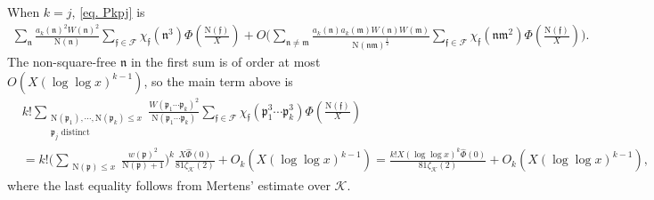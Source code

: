 \documentclass[11pt]{amsart}
\def\p{\mathfrak{p}}
\def\n{\mathfrak{n}}
\def\m{\mathfrak{m}}
\newcommand{\norm}{\mathrm{N}}
\numberwithin{equation}{section}
\theoremstyle{remark}
\begin{document}
When $k=j$, \eqref{eq. Pkpj} is 
\begin{align*}
\sum_{\n} \frac{ a_{k}(\n)^2W(\n)^2}{\norm(\n)} 
\sum_{\mathfrak{f}\in\mathcal{F}}
\chi_\mathfrak{f}(\n^3)
\Phi\left(\frac{\norm(\mathfrak{f})}{X}\right)
+
O\bigg( \sum_{\n\neq\m} \frac{ a_{k}(\n)a_{k}(\m)W(\n)W(\m)}{\norm(\n\m)^{\frac{1}{2}}} 
\sum_{\mathfrak{f}\in\mathcal{F}}
\chi_\mathfrak{f}(\n\m^2)
\Phi\left(\frac{\norm(\mathfrak{f})}{X}\right) \bigg).
\end{align*}
The non-square-free $\n$ in the first sum is of order at most $O(X(\log\log x)^{k-1})$, so the main term above is
\begin{align*}
&k!\sum_{\substack{ \norm(\p_1),\cdots, \norm(\p_k)\leq x\\\text{$\p_j$ distinct}}}\frac{W(\p_1\cdots \p_k)^2} {\norm(\p_1\cdots \p_k)} 
\sum_{\mathfrak{f}\in\mathcal{F}}
\chi_\mathfrak{f}(\p_1^3\cdots \p_k^3)
\Phi\left(\frac{\norm(\mathfrak{f})}{X}\right)\\
&= 
k!\Big(\sum_{\substack{\norm(\p)\leq x}}\frac{w(\p)^2}{\norm(\p)+1}\Big)^k
\frac{X\widehat{\Phi}(0)}{81\zeta_\mathcal{K}(2)} 
+
 O_{k}(X(\log\log x)^{k-1})
=
 \frac{k!X(\log \log x)^k\widehat{\Phi}(0)}{81\zeta_\mathcal{K}(2)}
 +
  O_{k}(X(\log\log x)^{k-1}),
\end{align*}
where the last equality follows from Mertens' estimate over $\mathcal{K}$.
\end{document}
